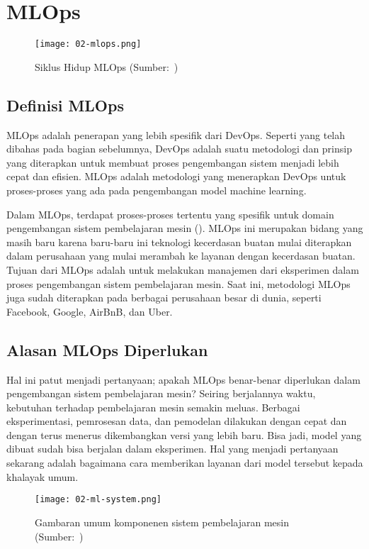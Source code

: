 \section{MLOps}

\begin{figure}[h]
  \centering
  \texttt{[image: 02-mlops.png]}
  \caption{Siklus Hidup MLOps (Sumber:~\cite{mlops})}
\end{figure}

\subsection{Definisi MLOps}

MLOps adalah penerapan yang lebih spesifik dari DevOps. 
Seperti yang telah dibahas pada bagian sebelumnya, DevOps adalah suatu metodologi dan prinsip yang diterapkan untuk membuat proses pengembangan sistem menjadi lebih cepat dan efisien.
MLOps adalah metodologi yang menerapkan DevOps untuk proses-proses yang ada pada pengembangan model machine learning.

Dalam MLOps, terdapat proses-proses tertentu yang spesifik untuk domain pengembangan sistem pembelajaran mesin (\cite{mlops}).\@
MLOps ini merupakan bidang yang masih baru karena baru-baru ini teknologi kecerdasan buatan mulai diterapkan dalam perusahaan yang mulai merambah ke layanan dengan kecerdasan buatan.
Tujuan dari MLOps adalah untuk melakukan manajemen dari eksperimen dalam proses pengembangan sistem pembelajaran mesin.
Saat ini, metodologi MLOps juga sudah diterapkan pada berbagai perusahaan besar di dunia, seperti Facebook, Google, AirBnB, dan Uber.

\subsection{Alasan MLOps Diperlukan}

Hal ini patut menjadi pertanyaan; apakah MLOps benar-benar diperlukan dalam pengembangan sistem pembelajaran mesin?
Seiring berjalannya waktu, kebutuhan terhadap pembelajaran mesin semakin meluas.
Berbagai eksperimentasi, pemrosesan data, dan pemodelan dilakukan dengan cepat dan dengan terus menerus dikembangkan versi yang lebih baru.
Bisa jadi, model yang dibuat sudah bisa berjalan dalam eksperimen.
Hal yang menjadi pertanyaan sekarang adalah bagaimana cara memberikan layanan dari model tersebut kepada khalayak umum.

\begin{figure}[ht]
  \centering
  \texttt{[image: 02-ml-system.png]}
  \caption{Gambaran umum komponenen sistem pembelajaran mesin (Sumber:~\cite{NIPS2015_86df7dcf})}\label{fig:ml-system}
\end{figure}

